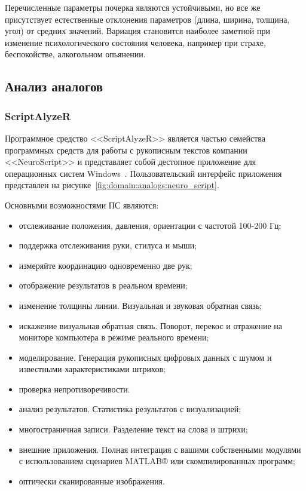 Перечисленные параметры почерка являются устойчивыми, но все же присутствует естественные отклонения параметров (длина, ширина, толщина, угол) от средних значений. Вариация становится наиболее заметной при изменение психологического состояния человека, например при страхе, беспокойстве, алкогольном опьянении.

\subsection{Анализ аналогов}
\label{sub:domain:analogs}

\subsubsection{ScriptAlyzeR}
\label{sub:domain:analogs:neuro_script} 

Программное средство <<ScriptAlyzeR>> является частью семейства программных средств для работы с рукописным текстов компании <<NeuroScript>> и представляет собой дестопное приложение для операционных систем Windows~\cite{analogs_scriptAlyzer}. Пользовательский интерфейс приложения представлен на рисунке~\ref{fig:domain:analogs:neuro_script}.

Основными возможностями ПС являются:
\begin{itemize}
  \item отслеживание положения, давления, ориентации с частотой 100-200 Гц;
	\item поддержка отслеживания руки, стилуса и мыши;
	\item измеряйте координацию одновременно две рук;
	\item отображение результатов в реальном времени;
	\item изменение толщины линии. Визуальная и звуковая обратная связь;
	\item искажение визуальная обратная связь. Поворот, перекос и отражение на мониторе компьютера в режиме реального времени;
	\item моделирование. Генерация рукописных цифровых данных с шумом и известными характеристиками штрихов;
	\item проверка непротиворечивости.
	\item анализ результатов. Статистика результатов с визуализацией;
	\item многостраничная записи. Разделение текст на слова и штрихи;
	\item внешние приложения. Полная интеграция с вашими собственными модулями с использованием сценариев MATLAB® или скомпилированных программ;
	\item оптически сканированные изображения.
\end{itemize}

